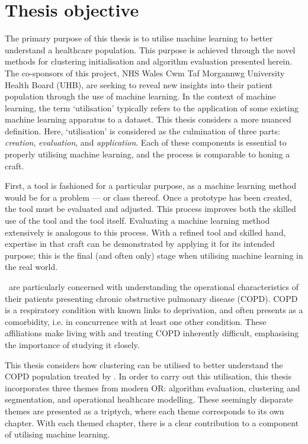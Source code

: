 \section{Thesis objective}\label{sec:objective}

The primary purpose of this thesis is to utilise machine learning to better
understand a healthcare population. This purpose is achieved through the novel
methods for clustering initialisation and algorithm evaluation presented herein.
The co-sponsors of this project, NHS Wales Cwm Taf Morgannwg University
Health Board (UHB), are seeking to reveal new insights into their patient
population through the use of machine learning. In the context of machine
learning, the term `utilisation' typically refers to the application of some
existing machine learning apparatus to a dataset. This thesis considers a more
nuanced definition. Here, `utilisation' is considered as the culmination of
three parts: \emph{creation}, \emph{evaluation}, and \emph{application}. Each of
these components is essential to properly utilising machine learning, and the
process is comparable to honing a craft.

First, a tool is fashioned for a particular purpose, as a machine learning
method would be for a problem --- or class thereof. Once a prototype has been
created, the tool must be evaluated and adjusted. This process improves both the
skilled use of the tool and the tool itself. Evaluating a machine
learning method extensively is analogous to this process. With a refined tool
and skilled hand, expertise in that craft can be demonstrated by applying it for
its intended purpose; this is the final (and often only) stage when utilising
machine learning in the real world.

\ctmuhb\ are particularly concerned with understanding the operational
characteristics of their patients presenting chronic obstructive pulmonary
disease (COPD). COPD is a respiratory condition with known links to deprivation,
and often presents as a comorbidity, i.e. in concurrence with at least one other
condition. These affiliations make living with and treating COPD inherently
difficult, emphasising the importance of studying it closely.

This thesis considers how clustering can be utilised to better understand the
COPD population treated by \ctmuhb. In order to carry out this utilisation, this
thesis incorporates three themes from modern OR: algorithm evaluation,
clustering and segmentation, and operational healthcare modelling. These
seemingly disparate themes are presented as a triptych, where each theme
corresponds to its own chapter. With each themed chapter, there is a clear
contribution to a component of utilising machine learning.

